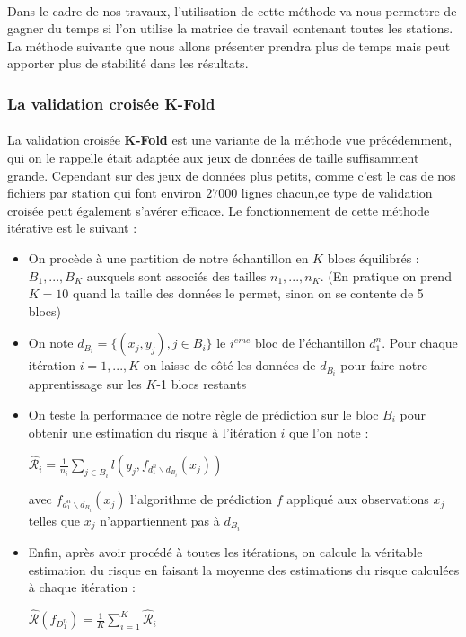 \documentclass[14pt, openany]{article}
\begin{document}
\paragraph{}
Dans le cadre de nos travaux, l'utilisation de cette méthode va nous permettre de gagner du temps si l'on utilise la matrice de travail contenant toutes les stations. La méthode suivante que nous allons présenter prendra plus de temps mais peut apporter plus de stabilité dans les résultats.
\newpage
\subsubsection{La validation croisée K-Fold}
\paragraph{}
La validation croisée \textbf{K-Fold} est une variante de la méthode vue précédemment, qui on le rappelle était adaptée aux jeux de données de taille suffisamment grande. Cependant sur des jeux de données plus petits, comme c'est le cas de nos fichiers par station qui font environ $27000$ lignes chacun,ce type de validation croisée peut également s'avérer efficace. Le fonctionnement de cette méthode itérative est le suivant :
\begin{itemize}
\item On procède à une partition de notre échantillon en $K$ blocs équilibrés : $B_1,...,B_K$ auxquels sont associés des tailles $n_1,...,n_K$. (En pratique on prend $K=10$ quand la taille des données le permet, sinon on se contente de 5 blocs)
\item On note $d_{B_i}=\{(x_j,y_j), j \in B_i\}$ le $i^{eme}$ bloc  de l'échantillon $d^{n}_{1}$. Pour chaque itération $i = 1,...,K$ on laisse de côté les données de $d_{B_i}$ pour faire notre apprentissage sur les $K$-1 blocs restants
\item On teste la performance de notre règle de prédiction sur le bloc $B_i$ pour obtenir une estimation du risque à l'itération $i$ que l'on note :
\begin{center}
$\widehat{\mathcal{R}}_i = \frac{1}{n_i} \sum\limits_{j \in B_i} l(y_j,f_{d^{n}_{1}\backslash d_{B_i}}(x_j))$
\end{center}
avec $f_{d^{n}_{1}\backslash d_{B_i}}(x_j)$ l'algorithme de prédiction $f$ appliqué aux observations $x_j$ telles que $x_j$ n'appartiennent pas à $d_{B_i}$
\item Enfin, après avoir procédé à toutes les itérations, on calcule la véritable estimation du risque en faisant la moyenne des estimations du risque calculées à chaque itération :
\begin{center}
$\widehat{\mathcal{R}}(f_{D^{n}_{1}}) = \frac{1}{K} \sum\limits_{i=1}^K \widehat{\mathcal{R}}_i$
\end{center}
\end{itemize}
\end{document}
